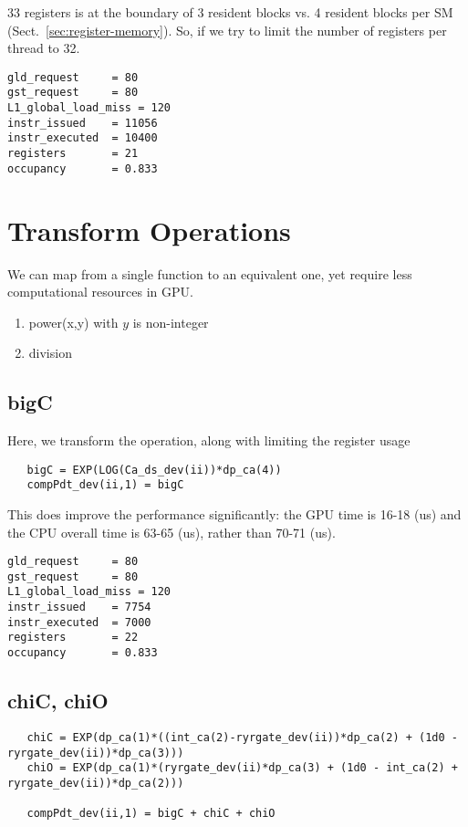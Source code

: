 33 registers is at the boundary of 3 resident blocks vs. 4 resident
blocks per SM (Sect.~\ref{sec:register-memory}). So, if we try to
limit the number of registers per thread to 32.
\begin{verbatim}
gld_request     = 80 
gst_request     = 80 
L1_global_load_miss = 120
instr_issued    = 11056
instr_executed  = 10400
registers       = 21
occupancy       = 0.833
\end{verbatim}

\section{Transform Operations}
\label{sec:transform-operations}

We can map from a single function to an equivalent one, yet require
less computational resources in GPU. 
\begin{enumerate}
\item power(x,y) with $y$ is non-integer 
\item division
\end{enumerate}

\subsection{bigC}
\label{sec:bigc}

Here, we transform the operation,
along with limiting the register usage
\begin{verbatim}
   bigC = EXP(LOG(Ca_ds_dev(ii))*dp_ca(4))
   compPdt_dev(ii,1) = bigC 
\end{verbatim}
This does improve the performance significantly: the GPU time is 16-18
(us) and the CPU overall time is 63-65 (us), rather than 70-71 (us). 
\begin{verbatim}
gld_request     = 80
gst_request     = 80 
L1_global_load_miss = 120
instr_issued    = 7754
instr_executed  = 7000
registers       = 22
occupancy       = 0.833
\end{verbatim}


\subsection{chiC, chiO}
\label{sec:chic-chio}

\begin{verbatim}
   chiC = EXP(dp_ca(1)*((int_ca(2)-ryrgate_dev(ii))*dp_ca(2) + (1d0 - ryrgate_dev(ii))*dp_ca(3)))
   chiO = EXP(dp_ca(1)*(ryrgate_dev(ii)*dp_ca(3) + (1d0 - int_ca(2) +
ryrgate_dev(ii))*dp_ca(2)))

   compPdt_dev(ii,1) = bigC + chiC + chiO
\end{verbatim}


